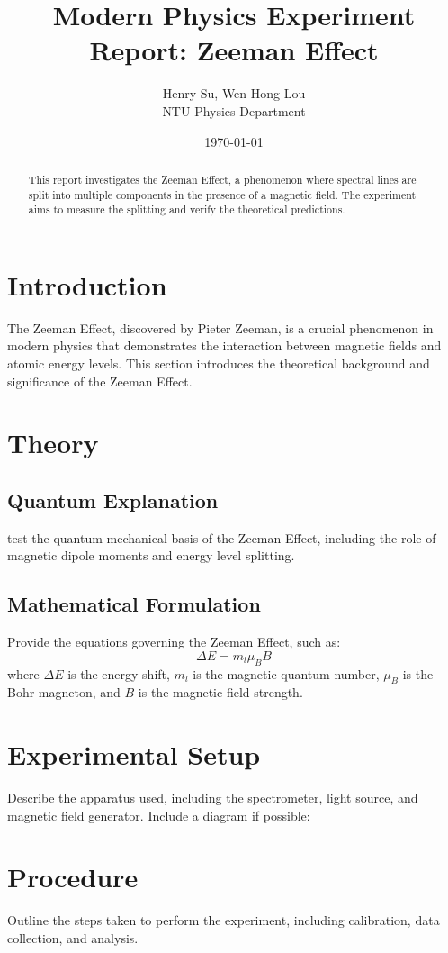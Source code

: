 \documentclass[a4paper,12pt]{article}
\title{Modern Physics Experiment Report: Zeeman Effect}
\author{Henry Su, Wen Hong Lou\\ NTU Physics Department}
\date{\today}
\begin{document}
\maketitle

\begin{abstract}
This report investigates the Zeeman Effect, a phenomenon where spectral lines are split into multiple components in the presence of a magnetic field. The experiment aims to measure the splitting and verify the theoretical predictions. 
\end{abstract}

\tableofcontents
\newpage

\section{Introduction}
The Zeeman Effect, discovered by Pieter Zeeman, is a crucial phenomenon in modern physics that demonstrates the interaction between magnetic fields and atomic energy levels. This section introduces the theoretical background and significance of the Zeeman Effect.

\section{Theory}
\subsection{Quantum Explanation}
test  the quantum mechanical basis of the Zeeman Effect, including the role of magnetic dipole moments and energy level splitting.

\subsection{Mathematical Formulation}
Provide the equations governing the Zeeman Effect, such as:
\[
\Delta E = m_l \mu_B B
\]
where \( \Delta E \) is the energy shift, \( m_l \) is the magnetic quantum number, \( \mu_B \) is the Bohr magneton, and \( B \) is the magnetic field strength.

\section{Experimental Setup}
Describe the apparatus used, including the spectrometer, light source, and magnetic field generator. Include a diagram if possible:

\section{Procedure}
Outline the steps taken to perform the experiment, including calibration, data collection, and analysis.
\end{document}
